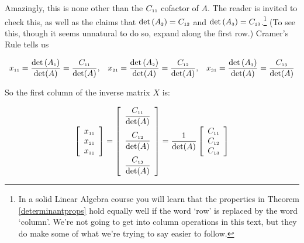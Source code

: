\documentclass{ximera}
\begin{document}
Amazingly, this is none other than the  $C_{\mbox{\tiny$11$}}$ cofactor of $A$.  The reader is invited to check this, as well as the claims that  $\det\left(A_{\mbox{\tiny$2$}}\right) = C_{\mbox{\tiny$12$}}$ and $\det\left(A_{\mbox{\tiny$3$}}\right) = C_{\mbox{\tiny$13$}}$.\footnote{In a solid Linear Algebra course you will learn that the properties in Theorem \ref{determinantprops} hold equally well if the word `row' is replaced by the word `column'.  We're not going to get into column operations in this text, but they do make some of what we're trying to say easier to follow.} (To see this, though it seems unnatural to do so, expand along the first row.) Cramer's Rule tells us

\[\begin{array}{ccc}

x_{\mbox{\tiny$11$}} = \dfrac{\det\left(A_{\mbox{\tiny$1$}}\right)}{\det(A)} = \dfrac{C_{\mbox{\tiny$11$}}}{\det(A)}, 
&
x_{\mbox{\tiny$21$}} = \dfrac{\det\left(A_{\mbox{\tiny$2$}}\right)}{\det(A)}  = \dfrac{C_{\mbox{\tiny$12$}}}{\det(A)}, 
&
 x_{\mbox{\tiny$31$}} = \dfrac{\det\left(A_{\mbox{\tiny$3$}}\right)}{\det(A)} = \dfrac{C_{\mbox{\tiny$13$}}}{\det(A)}


\end{array} \]

So the first column of the inverse matrix $X$ is:

\[  \left[ \begin{array}{r} x_{\mbox{\tiny$11$}} \\ x_{\mbox{\tiny$21$}} \\ x_{\mbox{\tiny$31$}} \end{array} \right] = \left[ \begin{array}{r} \dfrac{C_{\mbox{\tiny$11$}}}{\det(A)} \\ [13pt]  \dfrac{C_{\mbox{\tiny$12$}}}{\det(A)} \\  [13pt] \dfrac{C_{\mbox{\tiny$13$}}}{\det(A)} \end{array} \right] = \dfrac{1}{\det(A)} \left[ \begin{array}{r} C_{\mbox{\tiny$11$}} \\ C_{\mbox{\tiny$12$}} \\ C_{\mbox{\tiny$13$}} \end{array} \right]  \]
\end{document}
